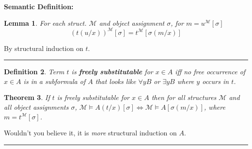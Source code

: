 \documentclass[twoside]{article}
\newcounter{lecnum}
\newtheorem{theorem}{Theorem}[lecnum]
\newtheorem{lemma}[theorem]{Lemma}
\newtheorem{definition}[theorem]{Definition}
\newenvironment{proof}{{\bf Proof:}}{\hfill\rule{2mm}{2mm}}
\def\M{\mathcal{M}}
\begin{document}
\textbf{Semantic Definition:} 
\begin{lemma}
For each struct. $\M$ and object assignment $\sigma$, for $m = u^{\M}[\sigma]$
\[(t(u/x))^{\M}[\sigma] = t^{\M}[\sigma(m/x)]\]
\end{lemma}
\begin{proof}
By structural induction on $t$.
\end{proof}

\begin{definition}
Term $t$ is \textbf{freely substitutable} for $x \in A$ iff no free occurrence of $x \in A$ is in a subformula of $A$ that looks like $\forall yB$ or $\exists yB$ where $y$ occurs in $t$. 
\end{definition}

\begin{theorem}
If $t$ is freely substitutable for $x \in A$ then for all structures $\M$ and all object assignments $\sigma$, $\M \vDash A(t/x)[\sigma] \iff \M \vDash A[\sigma (m/ x)]$, where $m = t^{\M}[\sigma]$.
\end{theorem}
\begin{proof}
Wouldn't you believe it, it is \emph{more} structural induction on $A$.
\end{proof}
\end{document}
